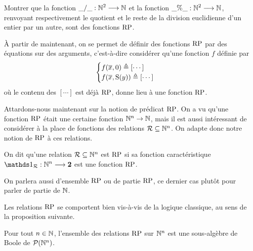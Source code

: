 \begin{exercise}
  Montrer que la fonction $\mathord{\_}/\mathord{\_} : \displaystyle \mathbb N^2 \longrightarrow \mathbb N$ et la fonction
  $\mathord{\_}\%\mathord{\_} : \displaystyle \mathbb N^2 \longrightarrow \mathbb N$, renvoyant respectivement le quotient
  et le reste de la division euclidienne d'un entier par un autre, sont des
  fonctions $\operatorname{RP}$.
\end{exercise}

\begin{remark}
  \`A partir de maintenant, on se permet de définir des fonctions $\operatorname{RP}$ par
  des équations sur des arguments, c'est-à-dire considérer qu'une fonction $f$
  définie par
  \[\begin{cases}
  f(\overline{x},0) \triangleq [\cdots]\\
  f(\overline{x},\operatorname{S}(y)) \triangleq [\cdots]
  \end{cases}\]
  où le contenu des $[\cdots]$ est déjà $\operatorname{RP}$, donne lieu à une fonction
  $\operatorname{RP}$.
\end{remark}

Attardons-nous maintenant sur la notion de prédicat $\operatorname{RP}$. On a vu qu'une
fonction $\operatorname{RP}$ était une certaine fonction $\mathbb N^n \to \mathbb N$, mais il est aussi
intéressant de considérer à la place de fonctions des relations
$\mathord{\mathrel{\mathcal{R}}}\subseteq\mathbb N^n$. On adapte donc notre notion de $\operatorname{RP}$ à ces
relations.

\begin{definition}[Relation RP]
  On dit qu'une relation $\mathord{\mathrel{\mathcal{R}}}\subseteq\mathbb N^n$ est $\operatorname{RP}$ si sa
  fonction caractéristique
  $\makeFunName{\indicP{\mathord{\varRR}}}{\bN^n}{\btwo}$ est une fonction
  $\operatorname{RP}$.
\end{definition}

\begin{remark}
  On parlera aussi d'ensemble $\operatorname{RP}$ ou de partie $\operatorname{RP}$, ce dernier cas
  plutôt pour parler de partie de $\mathbb N$.
\end{remark}

Les relations $\operatorname{RP}$ se comportent bien vis-à-vis de la logique classique, au
sens de la proposition suivante.

\begin{proposition}\label{prop.PRBool}
  Pour tout $n \in \mathbb N$, l'ensemble des relations $\operatorname{RP}$ sur $\mathbb N^n$ est une
  sous-algèbre de Boole de $\mathcal{P}(\mathbb N^n)$.
\end{proposition}


